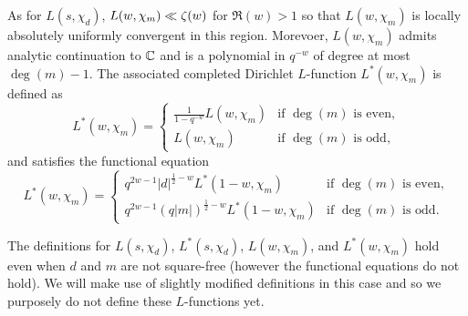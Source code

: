 \documentclass[12pt,reqno,oneside]{amsart}
\begin{document}
    As for $L(s,\chi_{d})$, $L(w,\chi_{m}) \ll \zeta(w)$ for $\Re(w) > 1$ so that $L(w,\chi_{m})$ is locally absolutely uniformly convergent in this region. Morevoer, $L(w,\chi_{m})$ admits analytic continuation to $\mathbb{C}$ and is a polynomial in $q^{-w}$ of degree at most $\deg(m)-1$. The associated completed Dirichlet $L$-function $L^{\ast}(w,\chi_{m})$ is defined as
    \[
        L^{\ast}(w,\chi_{m}) = \begin{cases} \frac{1}{1-q^{-w}}L(w,\chi_{m}) & \text{if $\deg(m)$ is even}, \\ L(w,\chi_{m}) & \text{if $\deg(m)$ is odd}, \end{cases}
    \]
    and satisfies the functional equation
    \[
        L^{\ast}(w,\chi_{m}) = \begin{cases} q^{2w-1}|d|^{\frac{1}{2}-w}L^{\ast}(1-w,\chi_{m}) & \text{if $\deg(m)$ is even}, \\ q^{2w-1}(q|m|)^{\frac{1}{2}-w}L^{\ast}(1-w,\chi_{m}) & \text{if $\deg(m)$ is odd}. \end{cases}
    \]

    \begin{remark}
        The definitions for $L(s,\chi_{d})$, $L^{\ast}(s,\chi_{d})$, $L(w,\chi_{m})$, and $L^{\ast}(w,\chi_{m})$ hold even when $d$ and $m$ are not square-free (however the functional equations do not hold). We will make use of slightly modified definitions in this case and so we purposely do not define these $L$-functions yet.
    \end{remark}
\end{document}
